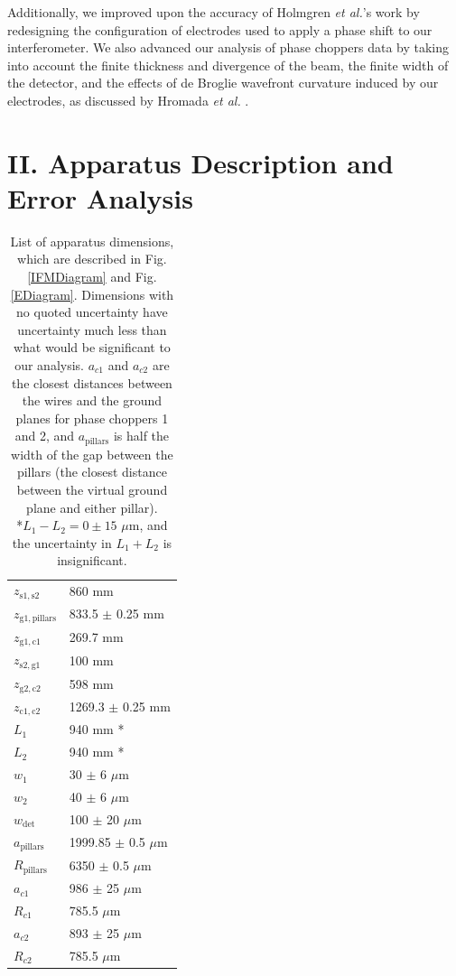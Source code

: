 \documentclass[twocolumn,prl,showpacs,superscriptaddress]{revtex4-1}   %
\newcommand{\figref}[1]{Fig. \ref{#1}}
\newcommand{\etal}{\textit{et al.}}
\newcommand{\etalspace}{\textit{et al. }}
\begin{document}
Additionally, we improved upon the accuracy of Holmgren \etal's work \cite{Holmgren2010} by redesigning the configuration of electrodes used to apply a phase shift to our interferometer. We also advanced our analysis of phase choppers data by taking into account the finite thickness and divergence of the beam, the finite width of the detector, and the effects of de Broglie wavefront curvature induced by our electrodes, as discussed by Hromada \etalspace \cite{Hromada2014}.


\section{II. Apparatus Description and Error Analysis}

\begingroup
\begin{table}
\caption{\label{tableDimensions}List of apparatus dimensions, which are described in \figref{IFMDiagram} and \figref{EDiagram}. Dimensions with no quoted uncertainty have uncertainty much less than what would be significant to our analysis.
$a_{c1}$ and $a_{c2}$ are the closest distances between the wires and the ground planes for phase choppers 1 and 2, and $a_{\mathrm{pillars}}$ is half the width of the gap between the pillars (the closest distance between the virtual ground plane and either pillar).
\\\hspace{\textwidth}
*$L_1-L_2 = 0 \pm 15$ $\mu$m, and the uncertainty in $L_1 + L_2$ is insignificant.}
\begin{center}
\begin{tabular}{l l}
\hline\hline
$z_{\mathrm{s1,s2}}$ & 860 mm \\
$z_{\mathrm{g1,pillars}}$ & 833.5 $\pm$ 0.25 mm \\
$z_{\mathrm{g1,c1}}$ & 269.7 mm \\
$z_{\mathrm{s2,g1}}$ & 100 mm \\
$z_{\mathrm{g2,c2}}$ & 598 mm \\
$z_{\mathrm{c1,c2}}$ & 1269.3 $\pm$ 0.25 mm \\
$L_1$ & 940 mm * \\
$L_2$ & 940 mm * \\
$w_1$ & 30 $\pm$ 6 $\mu$m \\
$w_2$ & 40 $\pm$ 6 $\mu$m \\
$w_{\mathrm{det}}$ & 100 $\pm$ 20 $\mu$m \\ 
$a_{\mathrm{pillars}}$ & 1999.85 $\pm$ 0.5 $\mu$m \\
$R_{\mathrm{pillars}}$ & 6350 $\pm$ 0.5 $\mu$m \\
$a_{c1}$ & 986 $\pm$ 25 $\mu$m \\
$R_{c1}$ & 785.5 $\mu$m \\
$a_{c2}$ & 893 $\pm$ 25 $\mu$m \\
$R_{c2}$ & 785.5 $\mu$m \\
\hline\hline
\end{tabular}
\end{center}
\end{table}
\endgroup
\end{document}
